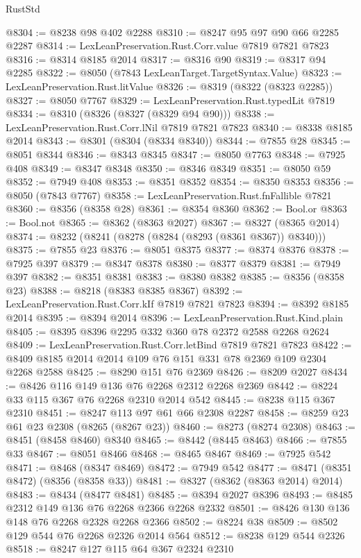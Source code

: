 \begin{lexlean}{RustStd}
\begin{coremodule}
{\begin{coremodule}
{{{{{{{{{{{{{{{{{{{{{{{{{{{{{{{{{{{{{{{{{{{{{{{{{{{{{{@8304 := @8238 @98 @402 @2288
@8310 := @8247 @95 @97 @90 @66 @2285 @2287
@8314 := LexLeanPreservation.Rust.Corr.value @7819 @7821 @7823
@8316 := @8314 @8185 @2014
@8317 := @8316 @90
@8319 := @8317 @94 @2285
@8322 := @8050 (@7843 LexLeanTarget.TargetSyntax.Value)
@8323 := LexLeanPreservation.Rust.litValue
@8326 := @8319 (@8322 (@8323 @2285))
@8327 := @8050 @7767
@8329 := LexLeanPreservation.Rust.typedLit @7819
@8334 := @8310 (@8326 (@8327 (@8329 @94 @90)))
@8338 := LexLeanPreservation.Rust.Corr.lNil @7819 @7821 @7823
@8340 := @8338 @8185 @2014
@8343 := @8301 (@8304 (@8334 @8340))
@8344 := @7855 @28
@8345 := @8051 @8344
@8346 := @8343 @8345
@8347 := @8050 @7763
@8348 := @7925 @408
@8349 := @8347 @8348
@8350 := @8346 @8349
@8351 := @8050 @59
@8352 := @7949 @408
@8353 := @8351 @8352
@8354 := @8350 @8353
@8356 := @8050 (@7843 @7767)
@8358 := LexLeanPreservation.Rust.fnFallible @7821
@8360 := @8356 (@8358 @28)
@8361 := @8354 @8360
@8362 := Bool.or
@8363 := Bool.not
@8365 := @8362 (@8363 @2027)
@8367 := @8327 (@8365 @2014)
@8374 := @8232 (@8241 (@8278 (@8284 (@8293 (@8361 @8367)) @8340)))
@8375 := @7855 @23
@8376 := @8051 @8375
@8377 := @8374 @8376
@8378 := @7925 @397
@8379 := @8347 @8378
@8380 := @8377 @8379
@8381 := @7949 @397
@8382 := @8351 @8381
@8383 := @8380 @8382
@8385 := @8356 (@8358 @23)
@8388 := @8218 (@8383 @8385 @8367)
@8392 := LexLeanPreservation.Rust.Corr.kIf @7819 @7821 @7823
@8394 := @8392 @8185 @2014
@8395 := @8394 @2014
@8396 := LexLeanPreservation.Rust.Kind.plain
@8405 := @8395 @8396 @2295 @332 @360 @78 @2372 @2588 @2268 @2624
@8409 := LexLeanPreservation.Rust.Corr.letBind @7819 @7821 @7823
@8422 := @8409 @8185 @2014 @2014 @109 @76 @151 @331 @78 @2369 @109 @2304 @2268 @2588
@8425 := @8290 @151 @76 @2369
@8426 := @8209 @2027
@8434 := @8426 @116 @149 @136 @76 @2268 @2312 @2268 @2369
@8442 := @8224 @33 @115 @367 @76 @2268 @2310 @2014 @542
@8445 := @8238 @115 @367 @2310
@8451 := @8247 @113 @97 @61 @66 @2308 @2287
@8458 := @8259 @23 @61 @23 @2308 (@8265 (@8267 @23))
@8460 := @8273 (@8274 @2308)
@8463 := @8451 (@8458 @8460) @8340
@8465 := @8442 (@8445 @8463)
@8466 := @7855 @33
@8467 := @8051 @8466
@8468 := @8465 @8467
@8469 := @7925 @542
@8471 := @8468 (@8347 @8469)
@8472 := @7949 @542
@8477 := @8471 (@8351 @8472) (@8356 (@8358 @33))
@8481 := @8327 (@8362 (@8363 @2014) @2014)
@8483 := @8434 (@8477 @8481)
@8485 := @8394 @2027 @8396
@8493 := @8485 @2312 @149 @136 @76 @2268 @2366 @2268 @2332
@8501 := @8426 @130 @136 @148 @76 @2268 @2328 @2268 @2366
@8502 := @8224 @38
@8509 := @8502 @129 @544 @76 @2268 @2326 @2014 @564
@8512 := @8238 @129 @544 @2326
@8518 := @8247 @127 @115 @64 @367 @2324 @2310
}}}}}}}}}}}}}}}}}}}}}}}}}}}}}}}}}}}}}}}}}}}}}}}}}}}}}}
\end{coremodule}}
\end{coremodule}
\end{lexlean}
